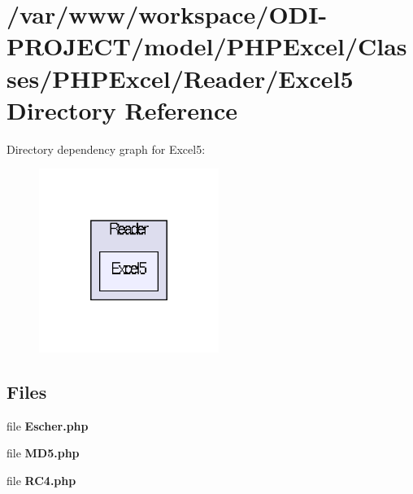 \section{/var/www/workspace/\+O\+D\+I-\/\+P\+R\+O\+J\+E\+C\+T/model/\+P\+H\+P\+Excel/\+Classes/\+P\+H\+P\+Excel/\+Reader/\+Excel5 Directory Reference}
\label{dir_fee17b89550179150576d5b507aeaa21}
Directory dependency graph for Excel5\+:\nopagebreak
\begin{figure}[H]
\begin{center}
\leavevmode
\includegraphics[width=166pt]{dir_fee17b89550179150576d5b507aeaa21_dep}
\end{center}
\end{figure}
\subsection*{Files}
\begin{DoxyCompactItemize}
\item 
file {\bfseries Escher.\+php}
\item 
file {\bfseries M\+D5.\+php}
\item 
file {\bfseries R\+C4.\+php}
\end{DoxyCompactItemize}
